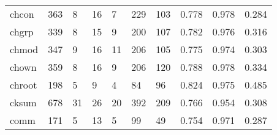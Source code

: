 \begin{longtable}{lp{2.0cm}p{2.0cm}p{2.0cm}p{2.0cm}p{2.0cm}p{2.0cm}p{2.0cm}p{2.0cm}p{2.0cm}}
chcon     &                    363 &                                  8 &                                16 &                                7 &                               229 &                             103 &                                   0.778 &                                  0.978 &                                0.284 \\
chgrp     &                    339 &                                  8 &                                15 &                                9 &                               200 &                             107 &                                   0.782 &                                  0.976 &                                0.316 \\
chmod     &                    347 &                                  9 &                                16 &                               11 &                               206 &                             105 &                                   0.775 &                                  0.974 &                                0.303 \\
chown     &                    359 &                                  8 &                                16 &                                9 &                               206 &                             120 &                                   0.788 &                                  0.978 &                                0.334 \\
chroot    &                    198 &                                  5 &                                 9 &                                4 &                                84 &                              96 &                                   0.824 &                                  0.975 &                                0.485 \\
cksum     &                    678 &                                 31 &                                26 &                               20 &                               392 &                             209 &                                   0.766 &                                  0.954 &                                0.308 \\
comm      &                    171 &                                  5 &                                13 &                                5 &                                99 &                              49 &                                   0.754 &                                  0.971 &                                0.287 \\

\end{longtable}
